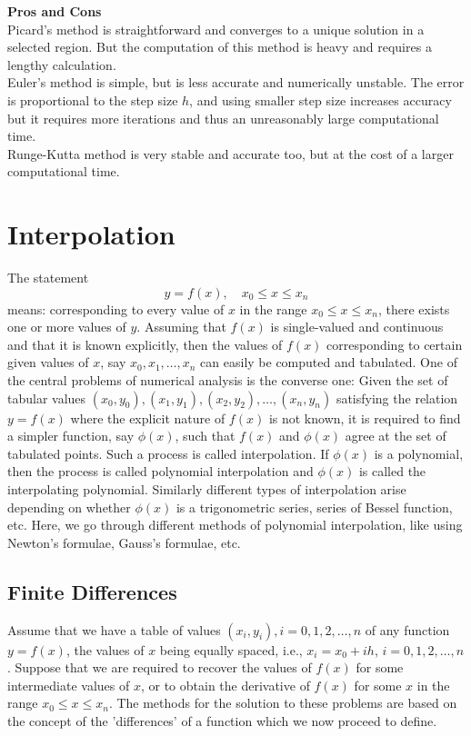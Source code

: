 \documentclass[12pt,a4paper,oneside]{book}
\begin{document}
\noindent
\textbf{\large Pros and Cons}\\
Picard's method is straightforward and converges to a unique solution in a selected region. But the computation of this method is heavy and requires a lengthy calculation.\\
Euler's method is simple, but is less accurate and numerically unstable. The error is proportional to the step size $h$, and using smaller step size increases accuracy but it requires more iterations and thus an unreasonably large computational time.\\
Runge-Kutta method is very stable and accurate too, but at the cost of a larger computational time.




\chapter{Interpolation}
The statement
$$
y=f(x), \quad x_0 \leq x \leq x_n
$$
means: corresponding to every value of $x$ in the range $x_0 \leq x \leq x_n$, there exists one or more values of $y$. Assuming that $f(x)$ is single-valued and continuous and that it is known explicitly, then the values of $f(x)$ corresponding to certain given values of $x$, say $x_0, x_1, \ldots, x_n$ can easily be computed and tabulated. One of the central problems of numerical analysis is the converse one: Given the set of tabular values $\left(x_0, y_0\right),\left(x_1, y_1\right),\left(x_2, y_2\right), \ldots,\left(x_n, y_n\right)$ satisfying the relation $y=f(x)$ where the explicit nature of $f(x)$ is not known, it is required to find a simpler function, say $\phi(x)$, such that $f(x)$ and $\phi(x)$ agree at the set of tabulated points. Such a process is called interpolation. If $\phi(x)$ is a polynomial, then the process is called polynomial interpolation and $\phi(x)$ is called the interpolating polynomial. Similarly different types of interpolation arise depending on whether $\phi(x)$ is a trigonometric series, series of Bessel function, etc. Here, we go through different methods of polynomial interpolation, like using Newton's formulae, Gauss's formulae, etc.
\section{Finite Differences}
Assume that we have a table of values $\left(x_i, y_i\right), i=0,1,2, \ldots, n$ of any function $y=f(x)$, the values of $x$ being equally spaced, i.e., $x_i=x_0+i h$, $i=0,1,2, \ldots, n$. Suppose that we are required to recover the values of $f(x)$ for some intermediate values of $x$, or to obtain the derivative of $f(x)$ for some $x$ in the range $x_0 \leq x \leq x_n$. The methods for the solution to these problems are based on the concept of the 'differences' of a function which we now proceed to define.\\
\end{document}

